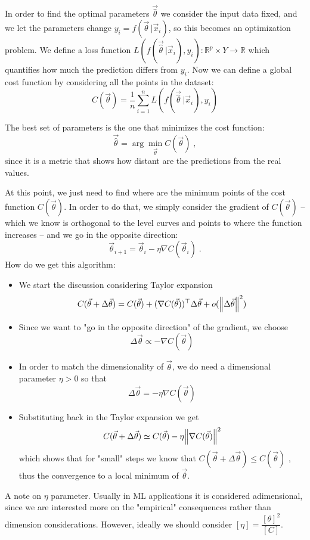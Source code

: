 \documentclass[12pt,a4paper]{article}
\begin{document}
In order to find the optimal parameters $\vec{\hat{\theta}}$ we consider the input data fixed, and we let the parameters change $y_i = f(\vec{\theta}\,|\vec{x}_i)$, so this becomes an optimization problem. We define a loss function $L(f(\vec{\hat{\theta}}\,| \vec{x}_i), y_i) : \mathbb{R}^p \times Y \to \mathbb{R}$ which quantifies how much the prediction differs from $y_i$. Now we can define a global cost function by considering all the points in the dataset:
\begin{equation*}
	C(\vec{\theta}) = \dfrac{1}{n} \sum_{i=1}^n L(f(\vec{\hat{\theta}}\,| \vec{x}_i), y_i)
\end{equation*}

The best set of parameters is the one that minimizes the cost function:
\begin{equation*}
	\vec{\hat{\theta}} = \arg \min_{\vec{\theta}} C(\vec{\theta})\;,
\end{equation*}
since it is a metric that shows how distant are the predictions from the real values.

At this point, we just need to find where are the minimum points of the cost function $C(\vec{\theta})$. In order to do that, we simply consider the gradient of $C(\vec{\theta})$ -- which we know is orthogonal to the level curves and points to where the function increases -- and we go in the opposite direction:
\begin{equation*}
	\vec{\theta}_{i+1} = \vec{\theta}_i - \eta \nabla C(\vec{\theta}_i)\;.
\end{equation*}
How do we get this algorithm:
\begin{itemize}
	\item[1.] We start the discussion considering Taylor expansion
	$$C(\vec{\theta} + \Delta \vec{\theta}) = C(\vec{\theta}) + (\nabla C(\vec{\theta}))^\top \Delta \vec{\theta} + o(\norm{\Delta \vec{\theta}}^2)$$
	\item[2.] Since we want to "go in the opposite direction" of the gradient, we choose $$ \Delta \vec{\theta} \propto -\nabla C(\vec{\theta})$$
	\item[3.] In order to match the dimensionality of $\vec{\theta}$, we do need a dimensional parameter $\eta > 0$ so that
	$$ \Delta \vec{\theta} = -\eta \nabla C(\vec{\theta})$$
	\item[4.] Substituting back in the Taylor expansion we get
	$$C(\vec{\theta} + \Delta \vec{\theta}) \simeq C(\vec{\theta}) - \eta \norm{\nabla C(\vec{\theta})}^2 $$ which shows that for "small" steps we know that $C(\vec{\theta} + \Delta \vec{\theta}) \leq C(\vec{\theta})$ , thus the convergence to a local minimum of $\vec{\theta}$.
\end{itemize}
A note on $\eta$ parameter. Usually in ML applications it is considered adimensional, since we are interested more on the "empirical" consequences rather than dimension considerations. However, ideally we should consider $\left[ \eta \right] = \dfrac{\left[ \theta \right]^2}{\left[ C \right]}$.
\end{document}
